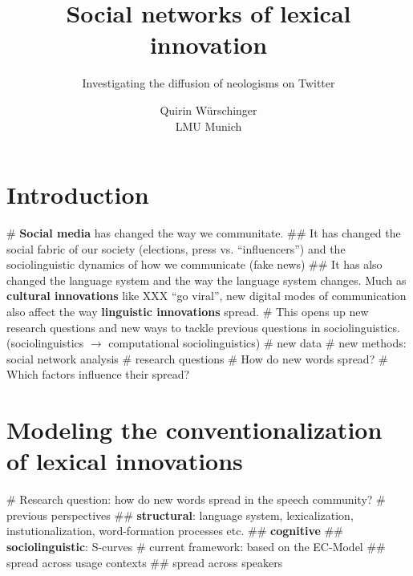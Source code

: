\documentclass[
  a4paper,
  ]{scrartcl}
\newcommand{\hw}[1]{\textbf{#1}}
\begin{document}

  \title{Social networks of lexical innovation}
  \subtitle{Investigating the diffusion of neologisms on Twitter}
  \author{Quirin Würschinger\\ LMU Munich}
  \maketitle

\listoftodos

\tableofcontents


\section{Introduction}

  \begin{easylist}[itemize]
    # \hw{Social media} has changed the way we communitate.
      ## It has changed the social fabric of our society (elections, press vs. \enquote{influencers}) and the sociolinguistic dynamics of how we communicate (fake news)
      ## It has also changed the language system and the way the language system changes. Much as \hw{cultural innovations} like XXX \enquote{go viral}, new digital modes of communication also affect the way \hw{linguistic innovations} spread. 
    # This opens up new research questions and new ways to tackle previous questions in sociolinguistics. (sociolinguistics $\rightarrow$ computational sociolinguistics)
      # new data
      # new methods: social network analysis
    # research questions
      # How do new words spread?
      # Which factors influence their spread?
  \end{easylist}

\section{Modeling the conventionalization of lexical innovations}

  \begin{easylist}[itemize]
    # Research question: how do new words spread in the speech community?
    # previous perspectives
      ## \hw{structural}: language system, lexicalization, instutionalization, word-formation processes etc. \cite{Bauer1983,Lipka2005}
      ## \hw{cognitive} \parencite{Schmid2008}
      ## \hw{sociolinguistic}: S-curves \parencite{Labov2007,Milroy1992}
    # current framework: based on the EC-Model \parencite{Schmid2019}
      ## spread across usage contexts
      ## spread across speakers
  \end{easylist}
\end{document}
